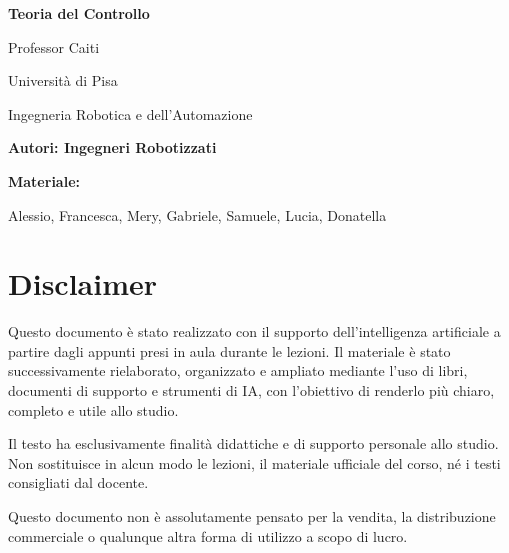 \documentclass[a4paper,12pt]{report}
\begin{document}
\begin{titlepage}
    \centering
    \vspace*{2cm}

    {\Huge\bfseries Teoria del Controllo\par}
    \vspace{0.8cm}

    {\Large Professor Caiti\par}
    \vspace{0.5cm}

    {\large Università di Pisa\par}
    \vspace{0.3cm}

    {\large Ingegneria Robotica e dell'Automazione\par}

    \vfill

    {\Large\bfseries Autori: Ingegneri Robotizzati\par}
    \vspace{0.8cm}

    {\large\textbf{Materiale:}\par}
    \vspace{0.2cm}
    {\large Alessio, Francesca, Mery, Gabriele, Samuele, Lucia, Donatella\par}

    \vfill

\end{titlepage}

\chapter*{Disclaimer}

Questo documento è stato realizzato con il supporto dell'intelligenza artificiale a partire dagli appunti presi in aula durante le lezioni. Il materiale è stato successivamente rielaborato, organizzato e ampliato mediante l'uso di libri, documenti di supporto e strumenti di IA, con l'obiettivo di renderlo più chiaro, completo e utile allo studio.

Il testo ha esclusivamente finalità didattiche e di supporto personale allo studio. Non sostituisce in alcun modo le lezioni, il materiale ufficiale del corso, né i testi consigliati dal docente.

Questo documento non è assolutamente pensato per la vendita, la distribuzione commerciale o qualunque altra forma di utilizzo a scopo di lucro.

\tableofcontents























\end{document}
